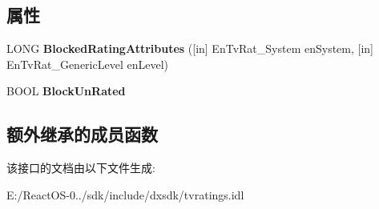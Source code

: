 \subsection*{属性}
\begin{DoxyCompactItemize}
\item 
\mbox{\label{interface_i_eval_rat_ac9c108449476cba7bdf9ebdf49bf5717}} 
L\+O\+NG {\bfseries Blocked\+Rating\+Attributes} (\mbox{[}in\mbox{]} En\+Tv\+Rat\+\_\+\+System en\+System, \mbox{[}in\mbox{]} En\+Tv\+Rat\+\_\+\+Generic\+Level en\+Level)
\item 
\mbox{\label{interface_i_eval_rat_a5a768c7c4c84db776c6eb118c705c3b6}} 
B\+O\+OL {\bfseries Block\+Un\+Rated}
\end{DoxyCompactItemize}
\subsection*{额外继承的成员函数}


该接口的文档由以下文件生成\+:\begin{DoxyCompactItemize}
\item 
E\+:/\+React\+O\+S-\/0../sdk/include/dxsdk/tvratings.\+idl\end{DoxyCompactItemize}
